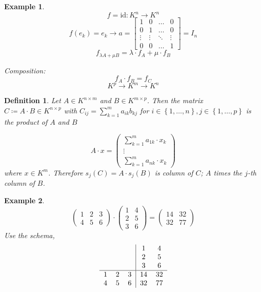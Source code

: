\documentclass[a4paper,landscape,twocolumn]{article}
\newcommand\set[1]{\left\{#1\right\}}
\newtheorem{defi}{Definition}[section]
\newtheorem{ex}{Example}[section]
\begin{document}
\begin{ex}
  \[ f = \text{id}: K^n \rightarrow K^n \]
  \[
    f(e_k) = e_k \rightarrow a = \begin{bmatrix}
      1 & 0 & \ldots & 0 \\
      0 & 1 & \ldots & 0 \\
      \vdots & \vdots & \ddots & \vdots \\
      0 & 0 & \ldots & 1
    \end{bmatrix}
    = I_n
  \] \[
    f_{\lambda A + \mu B} = \lambda \cdot f_A + \mu \cdot f_B
  \]

  Composition:
  \[ f_A \cdot f_B = f_C \]
  \[ K^p \to K^m \to K^n \]
\end{ex}
%
\begin{defi}
  Let $A \in K^{n\times m}$ and $B \in K^{m\times p}$.
  Then the matrix $C \coloneqq A \cdot B \in K^{n\times p}$ with $C_{ij} = \sum_{k=1}^m a_{ik} b_{kj}$ for $i \in \set{1, \ldots, n}, j \in \set{1, \ldots, p}$ is the \emph{product of $A$ and $B$}

  \[
    A \cdot x = \begin{pmatrix}
      \sum_{k=1}^m a_{1k} \cdot x_k \\
      \vdots \\
      \sum_{k=1}^m a_{nk} \cdot x_k
    \end{pmatrix}
  \]
  where $x \in K^m$. Therefore $s_j(C) = A \cdot s_j(B)$ is column of $C$;
  $A$ times the $j$-th column of $B$.
\end{defi}
\begin{ex}
  \[
    \begin{pmatrix}
      1 & 2 & 3 \\
      4 & 5 & 6
    \end{pmatrix}
    \cdot
    \begin{pmatrix}
      1 & 4 \\
      2 & 5 \\
      3 & 6
    \end{pmatrix} =
    \begin{pmatrix}
      14 & 32 \\
      32 & 77
    \end{pmatrix}
  \]
  Use the schema,
  \[
    \begin{tabular}{ccc|cc}
       & & & 1 & 4 \\
       & & & 2 & 5 \\
       & & & 3 & 6 \\
      \hline
       1 & 2 & 3 & 14 & 32 \\
       4 & 5 & 6 & 32 & 77
    \end{tabular}
  \]
\end{ex}
\end{document}
